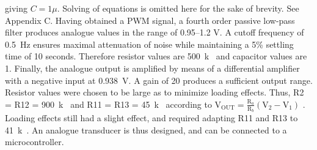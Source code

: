 giving $C = 1\mu$. Solving of equations is omitted here for the sake of brevity. See Appendix C. Having obtained a PWM signal, a fourth order passive low-pass filter produces analogue values in the range of \numrange{0.95}{1.2} \si{V}. A cutoff frequency of \SI{0.5}{Hz} ensures maximal attenuation of noise while maintaining a 5\% settling time of 10 seconds. Therefore resistor values are \SI{500}{k\Omega} and capacitor values are \SI{1}{\mu}. Finally, the analogue output is amplified by means of a differential amplifier with a negative input at \SI{0.938}{V}. A gain of 20 produces a sufficient output range. Resistor values were chosen to be large as to minimize loading effects. Thus, R2 = R12 = \SI{900}{k\Omega} and R11 = R13 = \SI{45}{k\Omega} according to $\mathrm{V}_{\mathrm{OUT}}=\frac{\mathrm{R}_{a}}{\mathrm{R}_{b}}\left(\mathrm{V}_{2}-\mathrm{V}_{1}\right)$ \cite{opamp}. Loading effects still had a slight effect, and required adapting R11 and R13 to \SI{41}{k\Omega}. An analogue transducer is thus designed, and can be connected to a microcontroller.

